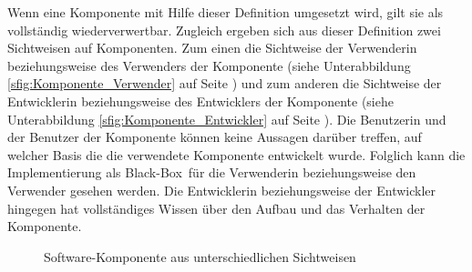 Wenn eine Komponente mit Hilfe dieser Definition umgesetzt wird, gilt sie als vollständig wiederverwertbar.
Zugleich ergeben sich aus dieser Definition zwei Sichtweisen auf Komponenten. Zum einen die Sichtweise der Verwenderin beziehungsweise des Verwenders der Komponente (siehe Unterabbildung \ref{sfig:Komponente_Verwender} auf Seite \pageref{sfig:Komponente_Verwender}) und zum anderen die Sichtweise der Entwicklerin beziehungsweise des Entwicklers der Komponente (siehe Unterabbildung \ref{sfig:Komponente_Entwickler} auf Seite \pageref{sfig:Komponente_Entwickler}). Die Benutzerin und der Benutzer der Komponente können keine Aussagen darüber treffen, auf welcher Basis die die verwendete Komponente entwickelt wurde. Folglich kann die Implementierung als \glqq Black-Box\grqq\ für die Verwenderin beziehungsweise den Verwender gesehen werden. Die Entwicklerin beziehungsweise der Entwickler hingegen hat vollständiges Wissen über den Aufbau und das Verhalten der Komponente.

\begin{figure}[h]
  \centering
  \qquad
  \caption[
    Software-Komponente aus unterschiedlichen Sichtweisen
  ]{
    Software-Komponente aus unterschiedlichen Sichtweisen
  }
  \label{fig:Komponente_Sichtweise}
\end{figure}

